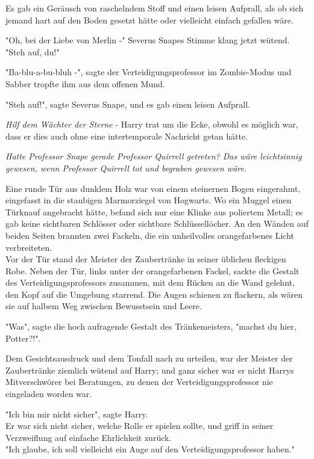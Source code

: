 {Es gab ein Geräusch von raschelndem Stoff und einen leisen Aufprall, als ob sich jemand hart auf den Boden gesetzt hätte oder vielleicht einfach gefallen wäre.

"Oh, bei der Liebe von Merlin -" Severus Snapes Stimme klang jetzt wütend. "Steh auf, du!"

"Ba-blu-a-bu-bluh -", sagte der Verteidigungsprofessor im Zombie-Modus und Sabber tropfte ihm aus dem offenen Mund.

"Steh auf!", sagte Severus Snape, und es gab einen leisen Aufprall.

\emph{Hilf dem Wächter der Sterne} - Harry trat um die Ecke, obwohl es möglich war, dass er dies auch ohne eine intertemporale Nachricht getan hätte.

\emph{Hatte Professor Snape gerade Professor Quirrell getreten? Das wäre leichtsinnig gewesen, wenn Professor Quirrell tot und begraben gewesen wäre.}

Eine runde Tür aus dunklem Holz war von einem steinernen Bogen eingerahmt, eingefasst in die staubigen Marmorziegel von Hogwarts. Wo ein Muggel einen Türknauf angebracht hätte, befand sich nur eine Klinke aus poliertem Metall; es gab keine sichtbaren Schlösser oder sichtbare Schlüssellöcher. An den Wänden auf beiden Seiten brannten zwei Fackeln, die ein unheilvolles orangefarbenes Licht verbreiteten.\\ Vor der Tür stand der Meister der Zaubertränke in seiner üblichen fleckigen Robe. Neben der Tür, links unter der orangefarbenen Fackel, sackte die Gestalt des Verteidigungsprofessors zusammen, mit dem Rücken an die Wand gelehnt, den Kopf auf die Umgebung starrend. Die Augen schienen zu flackern, als wären sie auf halbem Weg zwischen Bewusstsein und Leere.

"Was", sagte die hoch aufragende Gestalt des Tränkemeisters, "machst du hier, Potter?!".

Dem Gesichtsausdruck und dem Tonfall nach zu urteilen, war der Meister der Zaubertränke ziemlich wütend auf Harry; und ganz sicher war er nicht Harrys Mitverschwörer bei Beratungen, zu denen der Verteidigungsprofessor nie eingeladen worden war.

"Ich bin mir nicht sicher", sagte Harry.\\ Er war sich nicht sicher, welche Rolle er spielen sollte, und griff in seiner Verzweiflung auf einfache Ehrlichkeit zurück.\\ "Ich glaube, ich soll vielleicht ein Auge auf den Verteidigungsprofessor haben."

}

